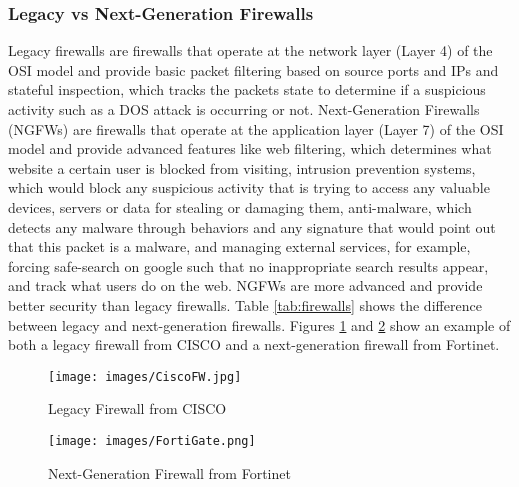 \documentclass[12pt]{report}
\begin{document}
\subsubsection{Legacy vs Next-Generation Firewalls}
Legacy firewalls are firewalls that operate at the network layer (Layer 4) of the OSI model and provide basic packet filtering based on source ports and IPs and stateful inspection, which tracks the packets state to determine if a suspicious activity such as a DOS attack is occurring or not. Next-Generation Firewalls (NGFWs) are firewalls that operate at the application layer (Layer 7) of the OSI model and provide advanced features like web filtering, which determines what website a certain user is blocked from visiting, intrusion prevention systems, which would block any suspicious activity that is trying to access any valuable devices, servers or data for stealing or damaging them, anti-malware, which detects any malware through behaviors and any signature that would point out that this packet is a malware, and managing external services, for example, forcing safe-search on google such that no inappropriate search results appear, and track what users do on the web. NGFWs are more advanced and provide better security than legacy firewalls. Table \ref{tab:firewalls} shows the difference between legacy and next-generation firewalls. \cite{legtoNGFW}
Figures \ref{fig:legacyFW} and \ref{fig:NGFW} show an example of both a legacy firewall from CISCO and a next-generation firewall from Fortinet.

\begin{figure}[h]
    \centering
    \texttt{[image: images/CiscoFW.jpg]}
    \caption{Legacy Firewall from CISCO \cite{CFWIMG}}
    \label{fig:legacyFW}
\end{figure}

\begin{figure}[h]
    \centering
    \texttt{[image: images/FortiGate.png]}
    \caption{Next-Generation Firewall from Fortinet \cite{FNFWIMG}}
    \label{fig:NGFW}
\end{figure}
\end{document}
